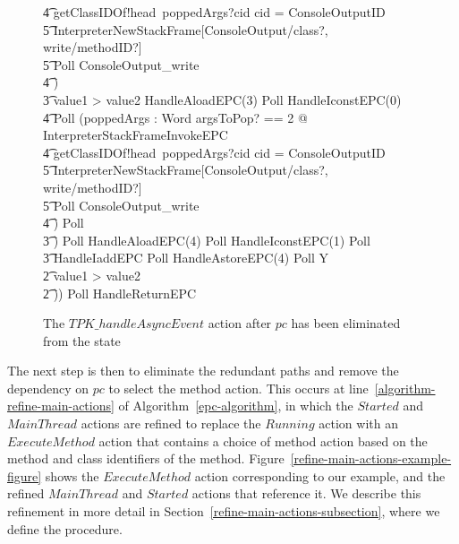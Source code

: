 \begin{figure}[tp!]
{\begin{circus}
    \t4 getClassIDOf!head~poppedArgs?cid \then \circif cid = ConsoleOutputID \circthen {} \\
    \t5 \lschexpract InterpreterNewStackFrame[ConsoleOutput/class?, write/methodID?] \rschexpract \circseq \\
    \t5 Poll \circseq ConsoleOutput\_write \\
    \t4 \circfi) \\
    \t3 {} \circelse value1 > value2 \circthen HandleAloadEPC(3) \circseq Poll \circseq HandleIconstEPC(0) \circseq \\
    \t4 Poll \circseq (\circvar poppedArgs : Word \circspot \lschexpract \exists argsToPop? == 2 @ InterpreterStackFrameInvokeEPC \rschexpract \circseq \\
    \t4 getClassIDOf!head~poppedArgs?cid \then \circif cid = ConsoleOutputID \circthen {} \\
    \t5 \lschexpract InterpreterNewStackFrame[ConsoleOutput/class?, write/methodID?] \rschexpract \circseq \\
    \t5 Poll \circseq ConsoleOutput\_write \\
    \t4 \circfi) \circseq Poll \\
    \t3 \circfi) \circseq Poll \circseq HandleAloadEPC(4) \circseq Poll \circseq HandleIconstEPC(1) \circseq Poll \circseq \\
    \t3 HandleIaddEPC \circseq Poll \circseq HandleAstoreEPC(4) \circseq Poll \circseq Y \\
    \t2 {} \circelse value1 > value2 \circthen \Skip \\
    \t2 \circfi)) \circseq Poll \circseq HandleReturnEPC
  \end{circus}
  }
  \caption{The $TPK\_handleAsyncEvent$ action after $pc$ has been eliminated from the state}
  \label{pc-elimination-HandleAsyncEvent-example-figure}
\end{figure}

The next step is then to eliminate the redundant paths and
remove the dependency on $pc$ to select the method action.
This occurs at line~\ref{algorithm-refine-main-actions} of
Algorithm~\ref{epc-algorithm}, in which the $Started$ and $MainThread$
actions are refined to replace the $Running$ action with an
$ExecuteMethod$ action that contains a choice of method action based
on the method and class identifiers of the method.
Figure~\ref{refine-main-actions-example-figure}
shows the $ExecuteMethod$ action corresponding to our example, and the
refined $MainThread$ and $Started$ actions that reference it.
We describe this refinement in more detail in
Section~\ref{refine-main-actions-subsection}, where we define the
 procedure.

